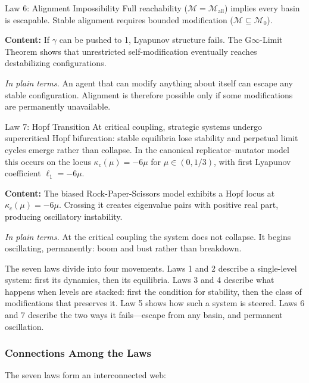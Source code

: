 \documentclass[12pt]{article}
\begin{document}
\begin{lawbox}{Law 6: Alignment Impossibility}
Full reachability ($\mathcal{M} = \mathcal{M}_{\text{all}}$) implies every basin is escapable. Stable alignment requires bounded modification ($\mathcal{M} \subseteq \mathcal{M}_0$).
\end{lawbox}

\noindent\textbf{Content:} If $\gamma$ can be pushed to 1, Lyapunov structure fails. The G$\infty$-Limit Theorem shows that unrestricted self-modification eventually reaches destabilizing configurations.

\noindent\textit{In plain terms.} An agent that can modify anything about itself can escape any stable configuration. Alignment is therefore possible only if some modifications are permanently unavailable.

\begin{lawbox}{Law 7: Hopf Transition}
At critical coupling, strategic systems undergo supercritical Hopf bifurcation:
stable equilibria lose stability and perpetual limit cycles emerge rather than
collapse. In the canonical replicator--mutator model this occurs on the locus
$\kappa_c(\mu) = -6\mu$ for $\mu \in (0,1/3)$, with first Lyapunov coefficient
$\ell_1 = -6\mu$.
\end{lawbox}

\noindent\textbf{Content:} The biased Rock-Paper-Scissors model exhibits a Hopf locus at $\kappa_c(\mu) = -6\mu$. Crossing it creates eigenvalue pairs with positive real part, producing oscillatory instability.

\noindent\textit{In plain terms.} At the critical coupling the system does not collapse. It begins oscillating, permanently: boom and bust rather than breakdown.

The seven laws divide into four movements. Laws 1 and 2 describe a single-level system: first its dynamics, then its equilibria. Laws 3 and 4 describe what happens when levels are stacked: first the condition for stability, then the class of modifications that preserves it. Law 5 shows how such a system is steered. Laws 6 and 7 describe the two ways it fails---escape from any basin, and permanent oscillation.

\subsubsection{Connections Among the Laws}

The seven laws form an interconnected web:
\end{document}
